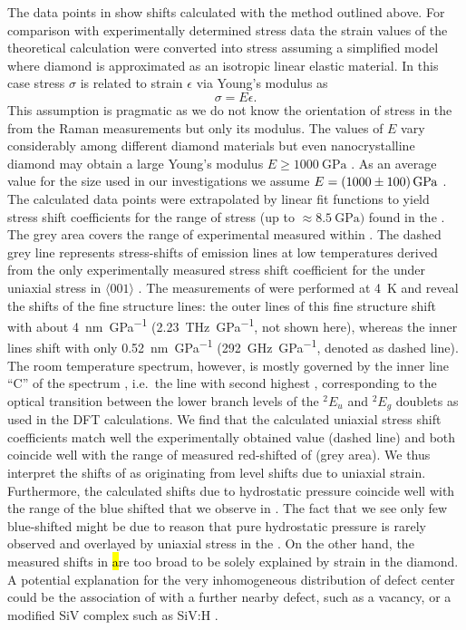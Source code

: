 	The data points in  show \ZPL \cwl shifts calculated with the method outlined above. For comparison with experimentally determined stress data the strain values of the theoretical calculation were converted into stress assuming a simplified model where diamond is approximated as an isotropic linear elastic material. In this case stress $\sigma$ is related to strain $\epsilon$ via Young’s modulus as
	\begin{equation}
		\sigma = E \epsilon .
	\end{equation}
	This assumption is pragmatic as we do not know the orientation of stress in the \nds from the Raman measurements but only its modulus. The values of $E$ vary considerably among different diamond materials \cite{hess2012mechanical} but even nanocrystalline diamond may obtain a large Young’s modulus $E \geq \SI{1000}{\GPa}$ \cite{williams2010high}. As an average value for the \nd size used in our investigations we assume $E = \SI[separate-uncertainty]{1000+-100}{\GPa}$ \cite{hess2012mechanical}. The calculated data points were extrapolated by linear fit functions to yield stress shift coefficients for the range of stress (up to $\approx \SI{8.5}{\GPa})$ found in the \nds. The grey area covers the \wl range of experimental \ZPL \wls measured within \vl. The dashed grey line represents stress-shifts of \siv emission lines at low temperatures derived from the only experimentally measured stress shift coefficient for the \siv under uniaxial stress in $\langle 001 \rangle$ \cite{Sternschulte1994,Hepp2014}. 
	The measurements of \cite{Sternschulte1994} were performed at \SI{4}{\kelvin} and reveal the shifts of the \siv fine structure lines: the outer lines of this fine structure shift with about \SI{4}{\nm\per\GPa} (\SI{2.23}{\THz\per\GPa}, not shown here), whereas the inner lines shift with only \SI{0.52}{\nm\per\GPa} (\SI{292}{\GHz\per\GPa}, denoted as dashed line). The room temperature spectrum, however, is mostly governed by the inner line ``C'' of the spectrum \cite{Arend2016a}, i.e.\ the line with second highest \wl, corresponding to the optical transition between the lower branch levels of the ${}^{2}E_{u}$ and ${}^{2}E_{g}$ doublets as used in the DFT calculations. We find that the calculated uniaxial stress shift coefficients match well the experimentally obtained value (dashed line) and both coincide well with the range of measured red-shifted \ZPLs of \vl (grey area). We thus interpret the \ZPL shifts of \vl as originating from level shifts due to uniaxial strain. 
	Furthermore, the calculated \ZPL shifts due to hydrostatic pressure coincide well with the range of the blue shifted \ZPLs that we observe in \vl. The fact that we see only few blue-shifted \ZPLs might be due to reason that pure hydrostatic pressure is rarely observed and overlayed by uniaxial stress in the \nds. 
	On the other hand, the measured shifts in \hl are too broad to be solely explained by strain in the diamond. A potential explanation for the very inhomogeneous distribution of defect center \ZPL \cwls could be the association of \sivs with a further nearby defect, such as a vacancy, or a modified SiV complex such as SiV:H \cite{Thiering2015}.

